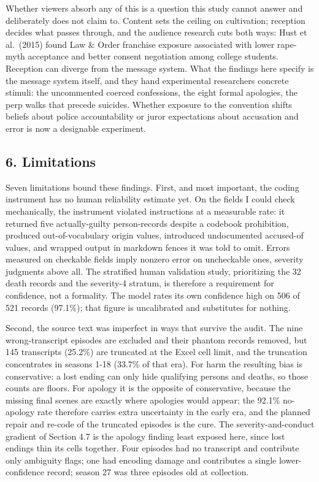 \documentclass[
]{article}
\begin{document}
Whether viewers absorb any of this is a question this study cannot
answer and deliberately does not claim to. Content sets the ceiling on
cultivation; reception decides what passes through, and the audience
research cuts both ways: Hust et al.~(2015) found Law \& Order franchise
exposure associated with lower rape-myth acceptance and better consent
negotiation among college students. Reception can diverge from the
message system. What the findings here specify is the message system
itself, and they hand experimental researchers concrete stimuli: the
uncommented coerced confessions, the eight formal apologies, the perp
walks that precede suicides. Whether exposure to the convention shifts
beliefs about police accountability or juror expectations about
accusation and error is now a designable experiment.

\subsection{6. Limitations}\label{limitations}

Seven limitations bound these findings. First, and most important, the
coding instrument has no human reliability estimate yet. On the fields I
could check mechanically, the instrument violated instructions at a
measurable rate: it returned five actually-guilty person-records despite
a codebook prohibition, produced out-of-vocabulary origin values,
introduced undocumented accused-of values, and wrapped output in
markdown fences it was told to omit. Errors measured on checkable fields
imply nonzero error on uncheckable ones, severity judgments above all.
The stratified human validation study, prioritizing the 32 death records
and the severity-4 stratum, is therefore a requirement for confidence,
not a formality. The model rates its own confidence high on 506 of 521
records (97.1\%); that figure is uncalibrated and substitutes for
nothing.

Second, the source text was imperfect in ways that survive the audit.
The nine wrong-transcript episodes are excluded and their phantom
records removed, but 145 transcripts (25.2\%) are truncated at the Excel
cell limit, and the truncation concentrates in seasons 1-18 (33.7\% of
that era). For harm the resulting bias is conservative: a lost ending
can only hide qualifying persons and deaths, so those counts are floors.
For apology it is the opposite of conservative, because the missing
final scenes are exactly where apologies would appear; the 92.1\%
no-apology rate therefore carries extra uncertainty in the early era,
and the planned repair and re-code of the truncated episodes is the
cure. The severity-and-conduct gradient of Section 4.7 is the apology
finding least exposed here, since lost endings thin its cells together.
Four episodes had no transcript and contribute only ambiguity flags; one
had encoding damage and contributes a single lower-confidence record;
season 27 was three episodes old at collection.
\end{document}
